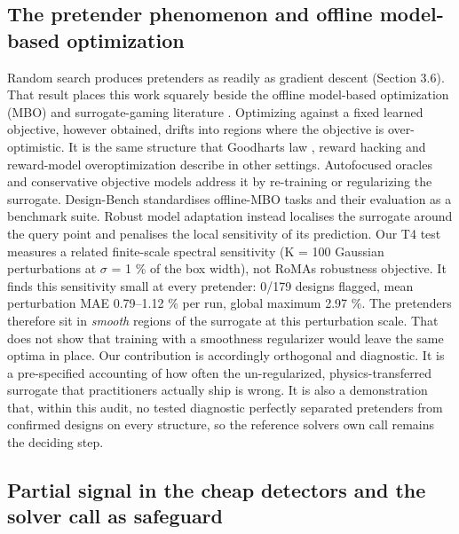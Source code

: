 \documentclass[11pt,a4paper]{article}
\begin{document}
\subsection{The pretender phenomenon and offline model-based optimization}\label{sec:4.3}

Random search produces pretenders as readily as gradient descent (Section 3.6). That
result places this work squarely beside the offline model-based optimization (MBO) and surrogate-gaming literature \cite{kumar202013,trabucco202114,trabucco202215,fannjiang202016}. Optimizing against a fixed learned objective, however obtained, drifts into
regions where the objective is over-optimistic. It is the same structure that Goodhart\textquotesingle s
law \cite{manheim201828}, reward hacking \cite{skalse202229} and reward-model overoptimization \cite{gao202330} describe in other
settings. Autofocused oracles \cite{fannjiang202016} and conservative objective models \cite{trabucco202114} address it by
re-training or regularizing the surrogate. Design-Bench \cite{trabucco202215} standardises offline-MBO
tasks and their evaluation as a benchmark suite. Robust model adaptation \cite{yu202126} instead
localises the surrogate around the query point and penalises the local sensitivity of its
prediction. Our T4 test measures a related finite-scale spectral sensitivity (K = 100
Gaussian perturbations at \ensuremath{\sigma} = 1 \% of the box width), not RoMA\textquotesingle s robustness objective. It
finds this sensitivity small at every pretender: 0/179 designs flagged, mean perturbation
MAE 0.79--1.12 \% per run, global maximum 2.97 \%. The pretenders therefore sit in \emph{smooth}
regions of the surrogate at this perturbation scale. That does not show that training with
a smoothness regularizer would leave the same optima in place. Our contribution is
accordingly orthogonal and diagnostic. It is a pre-specified accounting of how often the
un-regularized, physics-transferred surrogate that practitioners actually ship is wrong.
It is also a demonstration that, within this audit, no tested diagnostic perfectly
separated pretenders from confirmed designs on every structure, so the reference solver\textquotesingle s
own call remains the deciding step.

\subsection{Partial signal in the cheap detectors and the solver call as safeguard}\label{sec:4.4}
\end{document}
